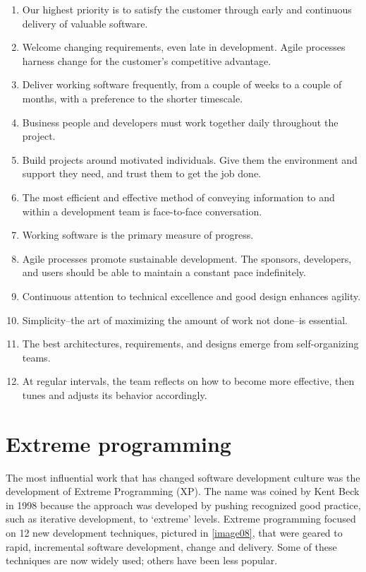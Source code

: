 \documentclass[10pt,a4paper]{report}
\begin{document}
\begin{enumerate}
\item Our highest priority is to satisfy the customer through early and continuous delivery of
valuable software.
\item  Welcome changing requirements, even late in development. Agile processes harness change
for the customer's competitive advantage.
\item  Deliver working software frequently, from a couple of weeks to a couple of months, with
a preference to the shorter timescale.
\item  Business people and developers must work together daily throughout the project.
\item  Build projects around motivated individuals. Give them the environment and support they
need, and trust them to get the job done.
\item  The most efficient and effective method of conveying information to and within a
development team is face-to-face conversation.
\item  Working software is the primary measure of progress.
\item  Agile processes promote sustainable development. The sponsors, developers, and users should
be able to maintain a constant pace indefinitely.
\item  Continuous attention to technical excellence and good design enhances agility.
\item  Simplicity--the art of maximizing the amount of work not done--is essential.
\item  The best architectures, requirements, and designs emerge from self-organizing teams.
\item  At regular intervals, the team reflects on how to become more effective, then tunes and
adjusts its behavior accordingly.
\end{enumerate}

\section{Extreme programming}
The most influential work that has changed software development culture
was the development of Extreme Programming (XP). The name was coined by Kent Beck in 1998 because the approach was developed by pushing recognized good practice, such as iterative
development, to ‘extreme’ levels.
Extreme programming focused on 12 new development techniques, pictured in \ref{image08}, that were geared to rapid, incremental software development, change and delivery. Some of these techniques are now widely used; others have been less popular.
\end{document}
